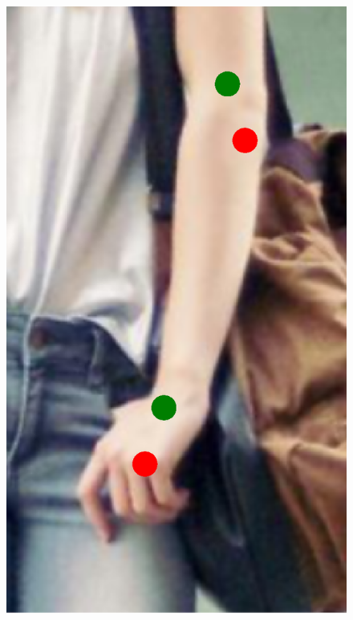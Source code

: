 \begin{figure}[!t]
    \includegraphics[height=\fh]{resources/Fixing/fix_13}
    \hfill

\end{figure}
